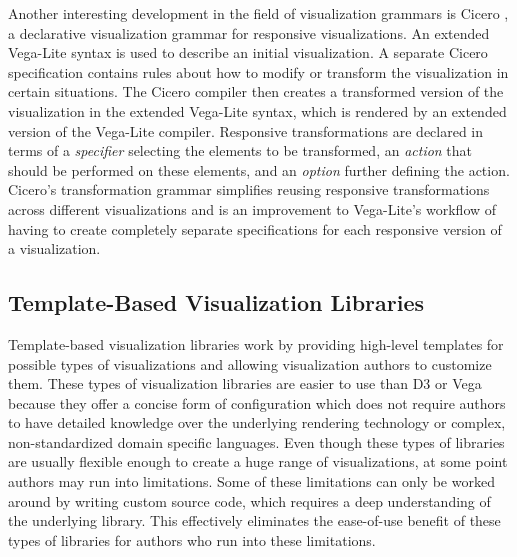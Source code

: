 \begin{samepage}
%
A Vega-Lite specification of the Vega bar chart shown in
Listings~\ref{list:VegaStaticBarChart} and~\ref{list:VegaBarChart}
combined.
},
]{listings/vega-lite-bar-chart.json}
\end{samepage}



Another interesting development in the field of visualization grammars
is Cicero \parencite{Cicero}, a declarative visualization grammar for
responsive visualizations. An extended Vega-Lite syntax is used to
describe an initial visualization. A separate Cicero specification
contains rules about how to modify or transform the visualization in
certain situations. The Cicero compiler then creates a transformed
version of the visualization in the extended Vega-Lite syntax, which
is rendered by an extended version of the Vega-Lite compiler.
%
Responsive transformations are declared in terms of a \emph{specifier}
selecting the elements to be transformed, an \emph{action} that should
be performed on these elements, and an \emph{option} further defining
the action. Cicero's transformation grammar simplifies reusing
responsive transformations across different visualizations and is an
improvement to Vega-Lite's workflow of having to create completely
separate specifications for each responsive version of a
visualization.






\subsection{Template-Based Visualization Libraries}

Template-based visualization libraries work by providing high-level
templates for possible types of visualizations and allowing
visualization authors to customize them. These types of visualization
libraries are easier to use than D3 or Vega because they offer a
concise form of configuration which does not require authors to have
detailed knowledge over the underlying rendering technology or
complex, non-standardized domain specific languages. Even though these
types of libraries are usually flexible enough to create a huge range
of visualizations, at some point authors may run into limitations.
Some of these limitations can only be worked around by writing custom
source code, which requires a deep understanding of the underlying
library. This effectively eliminates the ease-of-use benefit of these
types of libraries for authors who run into these limitations.

